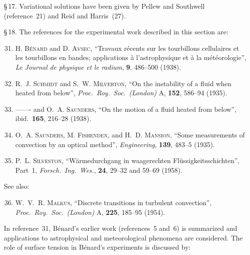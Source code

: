 \noindent \S\,17. Variational solutions have been given by Pellew and Southwell (reference~21)
and Reid and Harris~(27).

\noindent \S\,18. The references for the experimental work described in this section are:

\begin{enumerate}
\setcounter{enumi}{30}

\item H. \textsc{B\'enard} and D. \textsc{Avsec}, ``Travaux r\'ecents sur les tourbillons cellulaires
  et les tourbillons en bandes; applications \`a l'astrophysique et \`a la m\'et\'eorologie'',
  \textit{Le Journal de physique et le radium}, \textbf{9}, 486--500 (1938).

\item R.~J. \textsc{Schmidt} and S.~W. \textsc{Milverton}, ``On the instability of a fluid when
  heated from below'', \textit{Proc.\ Roy.\ Soc.\ (London)} A, \textbf{152}, 586--94
  (1935).

\item ------- and O.~A. \textsc{Saunders}, ``On the motion of a fluid heated from below'',
  ibid.\ \textbf{165}, 216--28 (1938).

\item O.~A. \textsc{Saunders}, M. \textsc{Fishenden}, and H.~D. \textsc{Mansion}, ``Some measurements
  of convection by an optical method'', \textit{Engineering}, \textbf{139}, 483--5 (1935).

\item P.~L. \textsc{Silveston}, ``W\"armedurchgang in waagerechten Fl\"ussigkeitsschichten'',
  Part~1, \textit{Forsch.\ Ing.\ Wes.}, \textbf{24}, 29--32 and 59--69 (1958).

\end{enumerate}

\noindent See also:

\begin{enumerate}
\setcounter{enumi}{35}

\item W.~V.~R. \textsc{Malkus}, ``Discrete transitions in turbulent convection'',
  \textit{Proc.\ Roy.\ Soc.\ (London)} A, \textbf{225}, 185--95 (1954).

\end{enumerate}

\noindent In reference~31, B\'enard's earlier work (references~5 and~6) is summarized and
applications to astrophysical and meteorological phenomena are considered. The
role of surface tension in B\'enard's experiments is discussed by:

